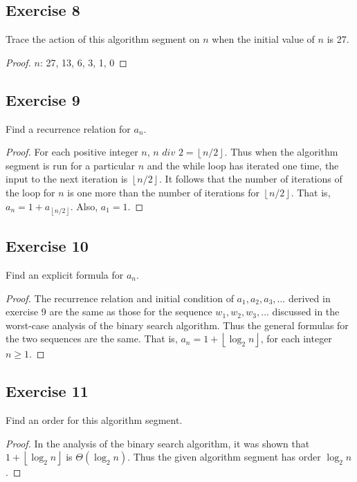 \documentclass[14pt]{extarticle}
\newcommand{\floor}[1]{{\left\lfloor#1\right\rfloor}}
\begin{document}
\subsection{Exercise 8}
Trace the action of this algorithm segment on \(n\) when the initial value of \(n\) is 27.

\begin{proof}
    \(n\): 27, 13, 6, 3, 1, 0
\end{proof}

\subsection{Exercise 9}
Find a recurrence relation for \(a_n\).
\begin{proof}
    For each positive integer \(n\), \(n \,\,div\,\, 2 = \floor{n/2}\). Thus when the algorithm segment is run for a particular
    \(n\) and the while loop has iterated one time, the input to the next iteration is \(\floor{n/2}\). It follows that the
    number of iterations of the loop for \(n\) is one more than the number of iterations for \(\floor{n/2}\). That is,
    \(a_n = 1 + a_{\floor{n/2}}\). Also, \(a_1 = 1\).
\end{proof}

\subsection{Exercise 10}
Find an explicit formula for \(a_n\).
\begin{proof}
    The recurrence relation and initial condition of \(a_1, a_2, a_3, \ldots\) derived in exercise 9 are the same as those for
    the sequence \(w_1, w_2, w_3, \ldots\) discussed in the worst-case analysis of the binary search algorithm. Thus the general
    formulas for the two sequences are the same. That is, \(a_n = 1 + \floor{\log_2 n}\), for each integer \(n \geq 1\).
\end{proof}

\subsection{Exercise 11}
Find an order for this algorithm segment.

\begin{proof}
    In the analysis of the binary search algorithm, it was shown that \(1 + \floor{\log_2 n}\) is \(\Theta(\log_2 n)\). Thus
    the given algorithm segment has order \(\log_2 n\).
\end{proof}
\end{document}

